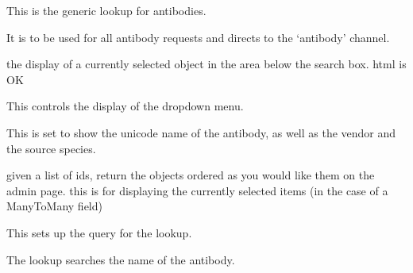 \documentclass[letterpaper,10pt,english]{sphinxmanual}
\begin{document}
\begin{fulllineitems}
\label{api:experimentdb.reagents.lookups.AntibodyLookup}
This is the generic lookup for antibodies.

It is to be used for all antibody requests and directs to the `antibody' channel.

\begin{fulllineitems}
\label{api:experimentdb.reagents.lookups.AntibodyLookup.format_item}
the display of a currently selected object in the area below the search box. html is OK

\end{fulllineitems}


\begin{fulllineitems}
\label{api:experimentdb.reagents.lookups.AntibodyLookup.format_result}
This controls the display of the dropdown menu.

This is set to show the unicode name of the antibody, as well as the vendor and the source species.

\end{fulllineitems}


\begin{fulllineitems}
\label{api:experimentdb.reagents.lookups.AntibodyLookup.get_objects}
given a list of ids, return the objects ordered as you would like them on the admin page.
this is for displaying the currently selected items (in the case of a ManyToMany field)

\end{fulllineitems}


\begin{fulllineitems}
\label{api:experimentdb.reagents.lookups.AntibodyLookup.get_query}
This sets up the query for the lookup.

The lookup searches the name of the antibody.

\end{fulllineitems}


\end{fulllineitems}
\end{document}
